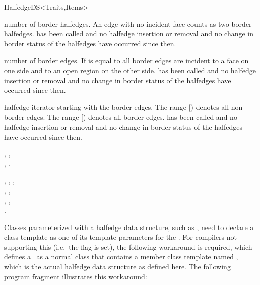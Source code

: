 \begin{ccRefConcept}{HalfedgeDS<Traits,Items>}
\begin{ccAdvanced}
    {number of border halfedges. An edge with no incident face
      counts as two border halfedges.
    \ccPrecond {} has been called and no
    halfedge insertion or removal and no change in border
    status of the halfedges have occurred since then.}

    {number of border edges. If  is equal
    to  all border edges are incident to
    a face on one side and to an open region on the other side.
    \ccPrecond {} has been called and no
    halfedge insertion or removal and no change in border
    status of the halfedges have occurred since then.}

    {halfedge iterator starting with the border edges. The range
      [) denotes
    all non-border edges. The range
    [) denotes all
    border edges.
    \ccPrecond {} has been called and no
    halfedge insertion or removal and no change in border
    status of the halfedges have occurred since then.}

\end{ccAdvanced}


\ccHasModels

,
,\\
,
.

\ccSeeAlso

,
,
,\\
,
,\\
,
,\\
.

\ccImplementation

Classes parameterized with a halfedge data structure, such as
, need to declare a class template as one of its
template parameters for the \ccRefName. For compilers not supporting
this (i.e.~the flag  is set), the
following workaround is required, which defines a \ccRefName\ as a
normal class that contains a member class template named ,
which is the actual halfedge data structure as defined here. The
following program fragment illustrates this workaround:


\end{ccRefConcept}
